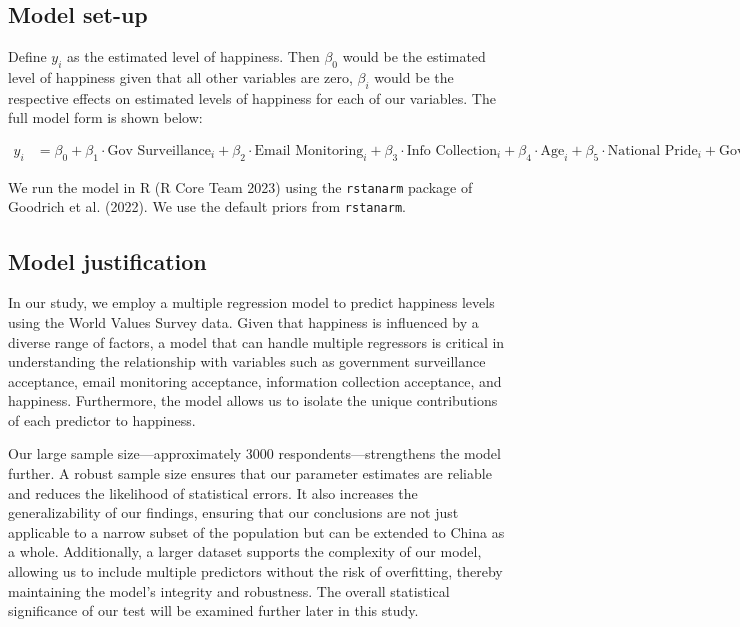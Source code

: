\documentclass[
  letterpaper,
  DIV=11,
  numbers=noendperiod]{scrartcl}
\begin{document}
\hypertarget{model-set-up}{%
\subsection{Model set-up}\label{model-set-up}}

Define \(y_i\) as the estimated level of happiness. Then \(\beta_0\)
would be the estimated level of happiness given that all other variables
are zero, \(\beta_i\) would be the respective effects on estimated
levels of happiness for each of our variables. The full model form is
shown below:

\begin{align} 
y_i &= \beta_0 + \beta_1 \cdot \text{Gov Surveillance}_i + \beta_2 \cdot \text{Email Monitoring}_i + \beta_3 \cdot \text{Info Collection}_i + \beta_4 \cdot \text{Age}_i + \beta_5 \cdot \text{National Pride}_i + \text{Government Responsibility}_i + \epsilon_i
\end{align}

We run the model in R (R Core Team 2023) using the \texttt{rstanarm}
package of Goodrich et al. (2022). We use the default priors from
\texttt{rstanarm}.

\hypertarget{model-justification}{%
\subsection{Model justification}\label{model-justification}}

In our study, we employ a multiple regression model to predict happiness
levels using the World Values Survey data. Given that happiness is
influenced by a diverse range of factors, a model that can handle
multiple regressors is critical in understanding the relationship with
variables such as government surveillance acceptance, email monitoring
acceptance, information collection acceptance, and happiness.
Furthermore, the model allows us to isolate the unique contributions of
each predictor to happiness.

Our large sample size---approximately 3000 respondents---strengthens the
model further. A robust sample size ensures that our parameter estimates
are reliable and reduces the likelihood of statistical errors. It also
increases the generalizability of our findings, ensuring that our
conclusions are not just applicable to a narrow subset of the population
but can be extended to China as a whole. Additionally, a larger dataset
supports the complexity of our model, allowing us to include multiple
predictors without the risk of overfitting, thereby maintaining the
model's integrity and robustness. The overall statistical significance
of our test will be examined further later in this study.
\end{document}
